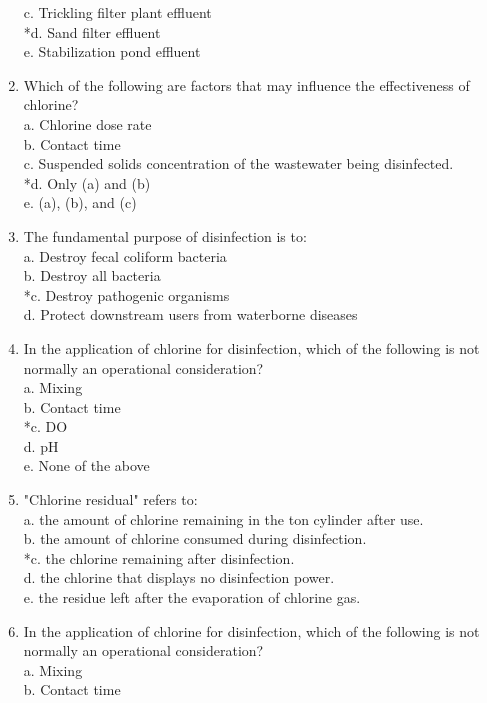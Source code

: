 \begin{enumerate}
c. Trickling filter plant effluent \\
*d. Sand filter effluent \\
e. Stabilization pond effluent \\
\item Which of the following are factors that may influence the effectiveness of chlorine? \\
a. Chlorine dose rate \\
b. Contact time \\
c. Suspended solids concentration of the wastewater being disinfected. \\
*d. Only (a) and (b) \\
e. (a), (b), and (c) \\
\item The fundamental purpose of disinfection is to: \\
a. Destroy fecal coliform bacteria \\
b. Destroy all bacteria \\
*c. Destroy pathogenic organisms \\
d. Protect downstream users from waterborne diseases \\
\item In the application of chlorine for disinfection, which of the following is not normally an operational consideration? \\
a. Mixing \\
b. Contact time \\
*c. DO \\
d. pH \\
e. None of the above \\
\item "Chlorine residual" refers to: \\
a. the amount of chlorine remaining in the ton cylinder after use. \\
b. the amount of chlorine consumed during disinfection. \\
*c. the chlorine remaining after disinfection. \\
d. the chlorine that displays no disinfection power. \\
e. the residue left after the evaporation of chlorine gas. \\
\item In the application of chlorine for disinfection, which of the following is not normally an operational consideration? \\
a. Mixing \\
b. Contact time \\

\end{enumerate}
